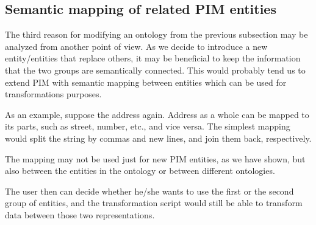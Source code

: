 
\newpage
\subsection{Semantic mapping of related PIM entities}

The third reason for modifying an ontology from the previous subsection may be analyzed from another point of view. As we decide to introduce a new entity/entities that replace others, it may be beneficial to keep the information that the two groups are semantically connected. This would probably tend us to extend PIM with semantic mapping between entities which can be used for transformations purposes.

As an example, suppose the address again. Address as a whole can be mapped to its parts, such as street, number, etc., and vice versa. The simplest mapping would split the string by commas and new lines, and join them back, respectively.

The mapping may not be used just for new PIM entities, as we have shown, but also between the entities in the ontology or between different ontologies.

The user then can decide whether he/she wants to use the first or the second group of entities, and the transformation script would still be able to transform data between those two representations.


